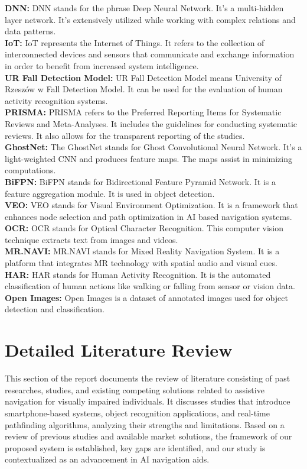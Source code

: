 \documentclass{FastFyp}
\begin{document}
    \textbf{DNN:} DNN stands for the phrase Deep Neural Network. It's a multi-hidden layer network. It's extensively utilized while working with complex relations and data patterns.\\
    \textbf{IoT:} IoT represents the Internet of Things. It refers to the collection of interconnected devices and sensors that communicate and exchange information in order to benefit from increased system intelligence.\\
    \textbf{UR Fall Detection Model:} UR Fall Detection Model means University of Rzeszów w Fall Detection Model. It can be used for the evaluation of human activity recognition systems.\\
    \textbf{PRISMA:} PRISMA refers to the Preferred Reporting Items for Systematic Reviews and Meta-Analyses. It includes the guidelines for conducting systematic reviews. It also allows for the transparent reporting of the studies.\\
    \textbf{GhostNet:} The GhostNet stands for Ghost Convolutional Neural Network. It's a light-weighted CNN and produces feature maps. The maps assist in minimizing computations.\\
    \textbf{BiFPN:} BiFPN stands for Bidirectional Feature Pyramid Network. It is a feature aggregation module. It is used in object detection.\\
    \textbf{VEO:} VEO stands for Visual Environment Optimization. It is a framework that enhances node selection and path optimization in AI based navigation systems.\\
    \textbf{OCR:} OCR stands for Optical Character Recognition. This computer vision technique extracts text from images and videos.\\
    \textbf{MR.NAVI:} MR.NAVI stands for Mixed Reality Navigation System. It is a platform that integrates MR technology with spatial audio and visual cues.\\
    \textbf{HAR:} HAR stands for Human Activity Recognition. It is the automated classification of human actions like walking or falling from sensor or vision data.\\
    \textbf{Open Images:} Open Images is a dataset of annotated images used for object detection and classification.


\section{Detailed Literature Review} 
This section of the report documents the review of literature consisting of past researches, studies, and existing competing solutions related to assistive navigation for visually impaired individuals. It discusses studies that introduce smartphone-based systems, object recognition applications, and real-time pathfinding algorithms, analyzing their strengths and limitations. Based on a review of previous studies and available market solutions, the framework of our proposed system is established, key gaps are identified, and our study is contextualized as an advancement in AI navigation aids.
\end{document}
